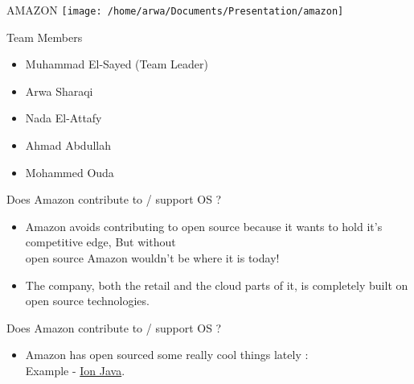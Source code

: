 \documentclass{beamer}
\begin{document}
\begin{frame}{AMAZON}
	\texttt{[image: /home/arwa/Documents/Presentation/amazon]}

\end{frame}


\begin{frame}{Team Members}
    
\begin{itemize}
    \item Muhammad El-Sayed (Team Leader)
    \pause
    \item Arwa Sharaqi
    \pause
    \item Nada El-Attafy
    \pause
    \item Ahmad Abdullah
    \pause
    \item Mohammed Ouda
    
\end{itemize}
\end{frame}

\begin{frame}{Does Amazon contribute to / support OS ?}
	\begin{itemize}
		
	\item Amazon avoids contributing to open source because it wants to hold it's competitive edge, But without\\ \huge open source \normalsize Amazon wouldn't be where it is today!
	
	\item The company, both the retail and the cloud parts of it, is completely built on open source technologies.
	
\end{itemize}
\end{frame}

	\begin{frame}{Does Amazon contribute to / support OS ?}
		\begin{itemize}

	\item Amazon has open sourced some really cool things lately :
	\\
	Example - \href{https://github.com/amznlabs/ion-java}{Ion Java}.
		
		\end{itemize}
	\end{frame}
	
\end{document}
